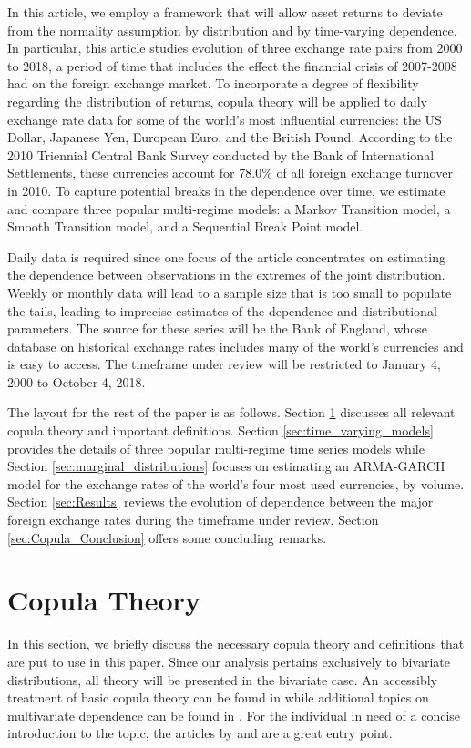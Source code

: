 In this article, we employ a framework that will allow asset returns to deviate from the normality assumption by distribution and by time-varying dependence. In particular, this article studies evolution of three exchange rate pairs from 2000 to 2018, a period of time that includes the effect the financial crisis of 2007-2008 had on the foreign exchange market. To incorporate a degree of flexibility regarding the distribution of returns, copula theory will be applied to daily exchange rate data for some of the world's most influential currencies: the US Dollar, Japanese Yen, European Euro, and the British Pound. According to the 2010 Triennial Central Bank Survey conducted by the Bank of International Settlements, these currencies account for 78.0\% of all foreign exchange turnover in 2010. To capture potential breaks in the dependence over time, we estimate and compare three popular multi-regime models: a Markov Transition model, a Smooth Transition model, and a Sequential Break Point model.

Daily data is required since one focus of the article concentrates on estimating the dependence between observations in the extremes of the joint distribution. Weekly or monthly data will lead to a sample size that is too small to populate the tails, leading to imprecise estimates of the dependence and distributional parameters. The source for these series will be the Bank of England, whose database on historical exchange rates includes many of the world's currencies and is easy to access. The timeframe under review will be restricted to January 4, 2000 to October 4, 2018.

The layout for the rest of the paper is as follows. Section \ref{sec:copula_theory} discusses all relevant copula theory and important definitions. Section \ref{sec:time_varying_models} provides the details of three popular multi-regime time series models while Section \ref{sec:marginal_distributions} focuses on estimating an ARMA-GARCH model for the exchange rates of the world's four most used currencies, by volume. Section \ref{sec:Results} reviews the evolution of dependence between the major foreign exchange rates during the timeframe under review. Section \ref{sec:Copula_Conclusion} offers some concluding remarks.

\section{Copula Theory} \label{sec:copula_theory}

In this section, we briefly discuss the necessary copula theory and definitions that are put to use in this paper. Since our analysis pertains exclusively to bivariate distributions, all theory will be presented in the bivariate case. An accessibly treatment of basic copula theory can be found in \cite{Nelsen_2007} while additional topics on multivariate dependence can be found in \cite{Joe_1997}. For the individual in need of a concise introduction to the topic, the articles by \cite{Embrechts_et_al_2003} and \cite{Genest_and_Favre_2007} are a great entry point.


